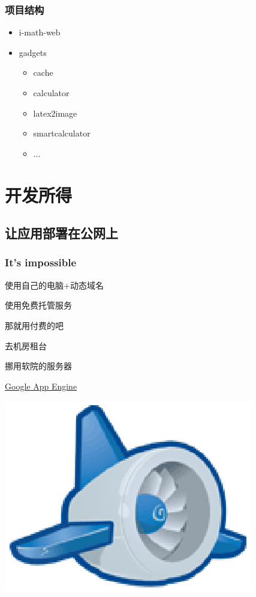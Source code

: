 \documentclass[dvipdfm,serif,mathserif]{beamer}
\begin{document}
\begin{frame}
  \frametitle{项目结构}
\begin{itemize}
 \item i-math-web
\item gadgets
\begin{itemize}
 \item cache
 \item calculator
 \item latex2image
 \item smartcalculator
 \item ...
\end{itemize}
\end{itemize}
\end{frame}

\section{开发所得}
\subsection{让应用部署在公网上}

\begin{frame}
  \frametitle{It's impossible}
\begin{itemize}
\begin{minipage}[c]{0.6\textwidth}
 \item 使用自己的电脑+动态域名
 \item 使用免费托管服务
\item 那就用付费的吧
\item 去机房租台
\item 挪用软院的服务器
\pause
 \item \href{http://code.google.com/appengine/}{\color{blue}Google App Engine}
  \end{minipage}
  \begin{minipage}[c]{0.3\textwidth}
  \includegraphics[width=\textwidth]{appengine_lowres.ps}
  \end{minipage}
\end{itemize}
\end{frame}
\end{document}

